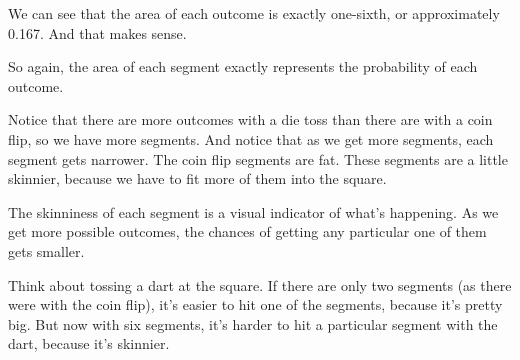 \documentclass[../../../main.tex]{subfiles}
\begin{document}
\begin{center}
\end{center}

We can see that the area of each outcome is exactly one-sixth, or approximately 0.167. And that makes sense. 

So again, the area of each segment exactly represents the probability of each outcome.

Notice that there are more outcomes with a die toss than there are with a coin flip, so we have more segments. And notice that as we get more segments, each segment gets narrower. The coin flip segments are fat. These segments are a little skinnier, because we have to fit more of them into the square.

The skinniness of each segment is a visual indicator of what's happening. As we get more possible outcomes, the chances of getting any particular one of them gets smaller. 

Think about tossing a dart at the square. If there are only two segments (as there were with the coin flip), it's easier to hit one of the segments, because it's pretty big. But now with six segments, it's harder to hit a particular segment with the dart, because it's skinnier. 
\end{document}
